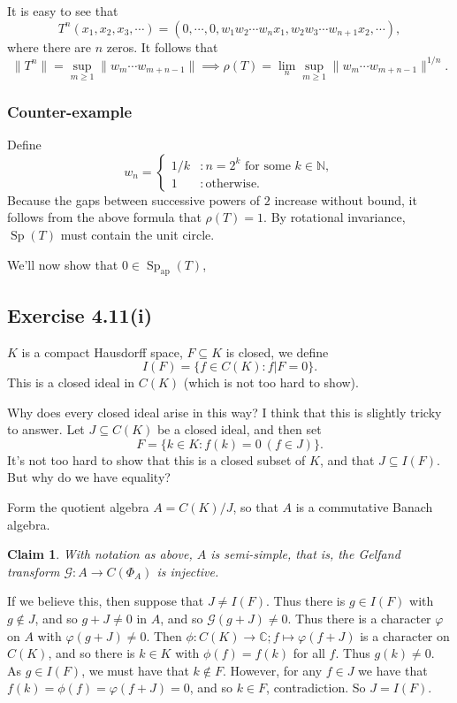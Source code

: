 \documentclass[twoside,12pt,a4paper]{article}
\theoremstyle{plain}
\newtheorem{claim}[proposition]{Claim}
\theoremstyle{definition}
\newcommand{\mc}{\mathcal}
\newcommand{\Sp}{\operatorname{Sp}}
\begin{document}
It is easy to see that
\[ T^n(x_1,x_2,x_3,\cdots) = (0,\cdots,0,w_1w_2\cdots w_nx_1,
w_2w_3\cdots w_{n+1}x_2, \cdots), \]
where there are $n$ zeros.  It follows that
\[ \|T^n\| = \sup_{m\geq 1} \| w_m \cdots w_{m+n-1} \|
\implies \rho(T) = \lim_n \sup_{m\geq 1} \| w_m \cdots w_{m+n-1} \|^{1/n}. \]

\subsubsection{Counter-example}

Define
\[ w_n = \begin{cases} 1/k &: n=2^k \text{ for some }k\in\mathbb N, \\
1 &: \text{otherwise}. \end{cases} \]
Because the gaps between successive powers of $2$ increase without bound,
it follows from the above formula that $\rho(T)=1$.  By rotational invariance,
$\Sp(T)$ must contain the unit circle.

We'll now show that $0\in\Sp_{\text{ap}}(T)$, 




\subsection{Exercise 4.11(i)}

$K$ is a compact Hausdorff space, $F\subseteq K$ is closed, we define
\[ I(F) = \{ f\in C(K) : f|F=0 \}. \]
This is a closed ideal in $C(K)$ (which is not too hard to show).

Why does every closed ideal arise in this way?  I think that this is slightly
tricky to answer.  Let $J\subseteq C(K)$ be a closed ideal, and then set
\[ F = \{ k\in K : f(k)=0 \ (f\in J) \}. \]
It's not too hard to show that this is a closed subset of $K$, and that
$J \subseteq I(F)$.  But why do we have equality?

Form the quotient algebra $A=C(K)/J$, so that $A$ is a commutative
Banach algebra.

\begin{claim}
With notation as above, $A$ is semi-simple, that is, the Gelfand
transform $\mc G:A\rightarrow C(\Phi_A)$ is injective.
\end{claim}

If we believe this, then suppose that $J\not=I(F)$.  Thus there is
$g\in I(F)$ with $g\not\in J$, and so $g+J\not=0$ in $A$, and so
$\mc G(g+J)\not=0$.  Thus there is a character $\varphi$ on $A$ with
$\varphi(g+J)\not=0$.  Then $\phi:C(K)\rightarrow\mathbb C; f\mapsto
\varphi(f+J)$ is a character on $C(K)$, and so there is $k\in K$ with
$\phi(f)=f(k)$ for all $f$.  Thus $g(k)\not=0$.  As $g\in I(F)$, we must
have that $k\not\in F$.  However, for any $f\in J$ we have that $f(k)=
\phi(f) = \varphi(f+J)=0$, and so $k\in F$, contradiction.  So $J=I(F)$.
\end{document}
